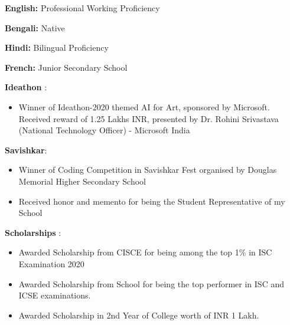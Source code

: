 \documentclass[a4paper, oneside, 12pt]{article}
\makeatletter
\def\vhrulefill#1{\leavevmode\leaders\hrule\@height#1\hfill \kern\z@}
\makeatother
\begin{document}
\begin{flushleft}
    \color{gray}{\vhrulefill{1.5pt}}
  \vspace{2mm}

  \color{black}
  \fontsize{12pt}{20pt}\selectfont
  \textbf{English:} Professional Working Proficiency

  \textbf{Bengali:} Native

  \textbf{Hindi:} Bilingual Proficiency

  \textbf{French:} Junior Secondary School

\end{flushleft}


\begin{flushleft}

    \color{gray}{\vhrulefill{1.5pt}}

  \vspace{2mm}

  \color{black}
  \textbf{Ideathon }:
  \begin{itemize}[label =]
    \item Winner of Ideathon-2020 themed AI for Art, sponsored by Microsoft. Received reward of 1.25 Lakhs INR, presented by Dr. Rohini Srivastava (National Technology Officer) - Microsoft India
  \end{itemize}

  \textbf{Savishkar}:
  \begin{itemize}[label =]
    \item Winner of Coding Competition in Savishkar Fest organised by Douglas Memorial Higher Secondary School
    \item Received honor and memento for being the Student Representative of my School
  \end{itemize}

  \textbf{Scholarships }:
  \begin{itemize}[label =]
    \item Awarded Scholarship from CISCE for being among the top 1\% in ISC Examination 2020
    \item Awarded Scholarship from School for being the top performer in ISC and ICSE examinations.
    \item Awarded Scholarship in 2nd Year of College worth of INR 1 Lakh.
  \end{itemize}

\end{flushleft}
\end{document}

